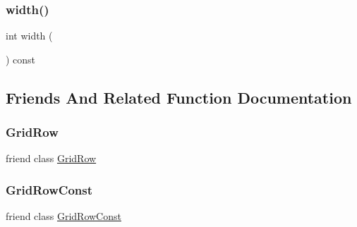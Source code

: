 \subsubsection{\texorpdfstring{width()}{width()}}
{\footnotesize\ttfamily int width (\begin{DoxyParamCaption}{ }\end{DoxyParamCaption}) const}



\subsection{Friends And Related Function Documentation}
\mbox{\label{classGrid_a20059dcdf5d8836488337c056079f5e2}} 
\subsubsection{\texorpdfstring{Grid\+Row}{GridRow}}
{\footnotesize\ttfamily friend class \mbox{\hyperlink{classGrid_1_1GridRow}{Grid\+Row}}\hspace{0.3cm}{\ttfamily [friend]}}

\mbox{\label{classGrid_aba3ef1df6ffede859468bdcab36ab6d6}} 
\subsubsection{\texorpdfstring{Grid\+Row\+Const}{GridRowConst}}
{\footnotesize\ttfamily friend class \mbox{\hyperlink{classGrid_1_1GridRowConst}{Grid\+Row\+Const}}\hspace{0.3cm}{\ttfamily [friend]}}

